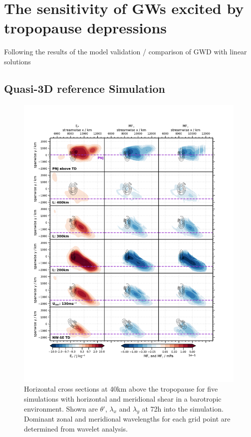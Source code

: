 \chapter{The sensitivity of GWs excited by tropopause depressions}
\label{sec:resultsQ3D}


Following the results of the model validation / comparison of GWD with linear solutions




\section{Quasi-3D reference Simulation}
\label{sec:resultsq3D-reference}

\begin{figure}[tbp]
    \centering
    \includegraphics[width=0.99\textwidth]{figures_3D/waveletAna_fluxes_obs.png}
    \caption{Horizontal cross sections at 40km above the tropopause for five simulations with horizontal and meridional shear in a barotropic environment. Shown are $\theta$', $\lambda_x$ and $\lambda_y$ at 72h into the simulation. Dominant zonal and meridional wavelengths for each grid point are determined from wavelet analysis.}
\end{figure}

